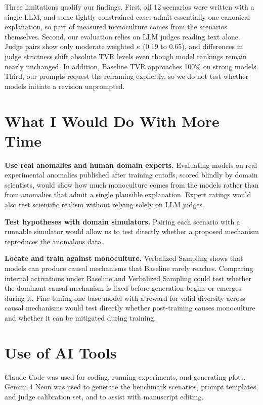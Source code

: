 \documentclass{article}
\begin{document}
Three limitations qualify our findings. First, all 12 scenarios were written with a single LLM, and some tightly constrained cases admit essentially one canonical explanation, so part of measured monoculture comes from the scenarios themselves. Second, our evaluation relies on LLM judges reading text alone. Judge pairs show only moderate weighted $\kappa$ (0.19 to 0.65), and differences in judge strictness shift absolute $\mathrm{TVR}$ levels even though model rankings remain nearly unchanged. In addition, Baseline $\mathrm{TVR}$ approaches 100\% on strong models. Third, our prompts request the reframing explicitly, so we do not test whether models initiate a revision unprompted.

\section{What I Would Do With More Time}
\label{sec:future}

\textbf{Use real anomalies and human domain experts.} Evaluating models on real experimental anomalies published after training cutoffs, scored blindly by domain scientists, would show how much monoculture comes from the models rather than from anomalies that admit a single plausible explanation. Expert ratings would also test scientific realism without relying solely on LLM judges.

\textbf{Test hypotheses with domain simulators.} Pairing each scenario with a runnable simulator would allow us to test directly whether a proposed mechanism reproduces the anomalous data.

\textbf{Locate and train against monoculture.} Verbalized Sampling shows that models can produce causal mechanisms that Baseline rarely reaches. Comparing internal activations under Baseline and Verbalized Sampling could test whether the dominant causal mechanism is fixed before generation begins or emerges during it. Fine-tuning one base model with a reward for valid diversity across causal mechanisms would test directly whether post-training causes monoculture and whether it can be mitigated during training.

\section{Use of AI Tools}
\label{sec:ai}

Claude Code was used for coding, running experiments, and generating plots. Gemini 4 Neon was used to generate the benchmark scenarios, prompt templates, and judge calibration set, and to assist with manuscript editing.
\end{document}
